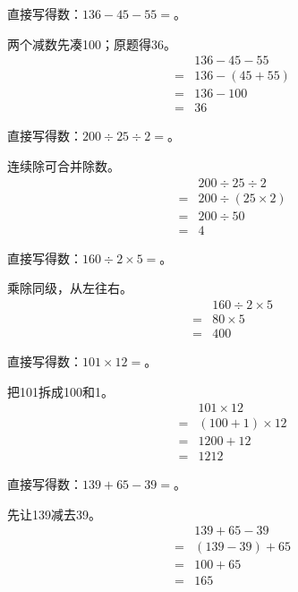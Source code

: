 直接写得数：\(136-45-55=\)。\par
\begin{BookAnswer}
两个减数先凑100；原题得36。\[\begin{aligned} &136-45-55\\={}&136-(45+55)\\={}&136-100\\={}&36\end{aligned}\]
\end{BookAnswer}

直接写得数：\(200\div25\div2=\)。\par
\begin{BookAnswer}
连续除可合并除数。\[\begin{aligned} &200\div25\div2\\={}&200\div(25\times2)\\={}&200\div50\\={}&4\end{aligned}\]
\end{BookAnswer}

直接写得数：\(160\div2\times5=\)。\par
\begin{BookAnswer}
乘除同级，从左往右。\[\begin{aligned} &160\div2\times5\\={}&80\times5\\={}&400\end{aligned}\]
\end{BookAnswer}

直接写得数：\(101\times12=\)。\par
\begin{BookAnswer}
把101拆成100和1。\[\begin{aligned} &101\times12\\={}&(100+1)\times12\\={}&1200+12\\={}&1212\end{aligned}\]
\end{BookAnswer}

直接写得数：\(139+65-39=\)。\par
\begin{BookAnswer}
先让139减去39。\[\begin{aligned} &139+65-39\\={}&(139-39)+65\\={}&100+65\\={}&165\end{aligned}\]
\end{BookAnswer}

